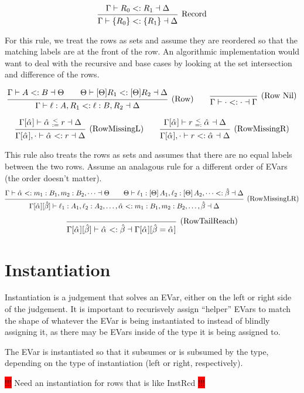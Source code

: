 \documentclass{article}
\newcommand{\consider}[1]{\colorbox{red}{!!!} #1 \colorbox{red}{!!!}}
\newcommand{\subsume}{<:}
\newcommand{\instLSymbol}{\;\substack{<\\:=}\;}
\newcommand{\instRSymbol}{\;\substack{<\\=:}\;}
\newcommand{\ev}{\hat}
\newcommand{\spc}{\qquad}
\newcommand{\apply}[1]{\left[#1\right]}
\newcommand{\eva}[1][]{\ev \alpha_{#1}}
\newcommand{\evb}{\ev \beta}
\newcommand{\subsumes}[4]{#1 \vdash #2 \subsume #3 \dashv #4}
\newcommand{\instL}[4]{#1 \vdash #2 \instLSymbol #3 \dashv #4}
\newcommand{\instR}[4]{#1 \vdash #2 \instRSymbol #3 \dashv #4}
\newcommand{\deduct}[3][]
{
  \begin{prooftree}
    \hypo{#2}
    \infer1[\text{#1}]{#3}
  \end{prooftree}
}
\begin{document}
\[
  \deduct[Record]{\subsumes{\Gamma}{R_0}{R_1}{\Delta}}{\subsumes{\Gamma}{\{R_0\}}{\{R_1\}}{\Delta}}
\]

For this rule, we treat the rows as sets and assume they are reordered so that
the matching labels are at the front of the row. An algorithmic implementation
would want to deal with the recursive and base cases by looking at the set
intersection and difference of the rows.

\[
  \deduct[(Row)]
  {\subsumes{\Gamma}{A}{B}{\Theta}
    \spc
    \subsumes{\Theta}{[\Theta] R_1}{[\Theta] R_2}{\Delta}
  }
  { \subsumes{\Gamma}{\ell : A, R_1}{\ell : B, R_2}{\Delta} }
  \spc
  \deduct[(Row Nil)]{}{ \subsumes{\Gamma}{\cdot}{\cdot}{\Gamma} }
\]

\[
  \deduct[(RowMissingL)]
  {\instL{\Gamma[\eva]}{\eva}{r}{\Delta}}
  {\subsumes{\Gamma[\eva], \cdot}{\eva}{r}{\Delta}}
  \spc
  \deduct[(RowMissingR)]
  {\instR{\Gamma[\eva]}{r}{\eva}{\Delta}}
  {\subsumes{\Gamma[\eva], \cdot}{r}{\eva}{\Delta}}
\]

This rule also treats the rows as sets and assumes that there are no equal
labels between the two rows. Assume an analagous rule for a different order of
EVars (the order doesn't matter).
\[
  \deduct[(RowMissingLR)]
  {\subsumes{\Gamma}{\eva}{m_1 : B_1, m_2 : B_2, \dots}{\Theta} \spc
    \subsumes{\Theta}{\ell_1 : \apply\Theta A_1, \ell_2 : \apply\Theta A_2,
      \dots}{\evb}{\Delta}}
  {\subsumes{\Gamma[\eva][\evb]}{\ell_1 : A_1, \ell_2 : A_2, \dots, \eva}{m_1 :
      B_1, m_2 : B_2, \dots, \evb}{\Delta}}
\]

\[
  \deduct[(RowTailReach)]
  {}
  {\subsumes{\Gamma[\eva][\evb]}{\eva}{\evb}{\Gamma[\eva][\evb=\eva]}}
\]


\section{Instantiation}

Instantiation is a judgement that solves an EVar, either on the left or right
side of the judgement. It is important to recurisvely assign ``helper'' EVars to
match the shape of whatever the EVar is being instantiated to instead of blindly
assigning it, as there may be EVars inside of the type it is being assigned to.

The EVar is instantiated so that it subsumes or is subsumed by the type,
depending on the type of instantiation (left or right, respectively).

\consider{Need an instantiation for rows that is like InstRcd}
\end{document}
